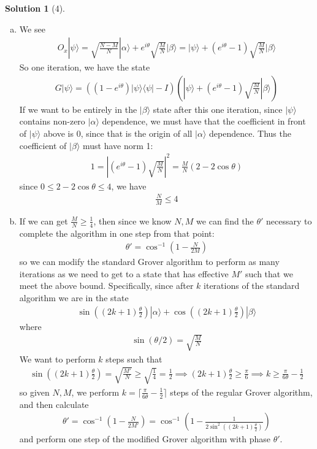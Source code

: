 \documentclass[11pt]{article}
\theoremstyle{definition}
\newtheorem*{solution}{Solution}
\newcommand{\eq}{\begin{equation}\begin{aligned}}
\newcommand{\qe}{\end{aligned}\end{equation}}
\newcommand{\bra}[1]{\langle #1|}
\newcommand{\ket}[1]{|#1\rangle}
\begin{document}
\begin{solution}[4]
  \begin{enumerate}[(a)]
    \item We see
    \eq
      O_x\ket{\psi}=\sqrt{\frac{N-M}{N}}\ket{\alpha}+e^{i\theta}\sqrt{\frac{M}{N}}\ket{\beta}=\ket{\psi}+(e^{i\theta}-1)\sqrt{\frac{M}{N}}\ket{\beta}
    \qe
    So one iteration, we have the state
    \eq
      G\ket{\psi}=((1-e^{i\theta})\ket{\psi}\bra{\psi}-I)\left(\ket{\psi}+(e^{i\theta}-1)\sqrt{\frac{M}{N}}\ket{\beta}\right)
    \qe
    If we want to be entirely in the $\ket{\beta}$ state after this one iteration, since $\ket{\psi}$ contains non-zero $\ket{\alpha}$ dependence, we must have that the coefficient in front of $\ket{\psi}$ above is 0, since that is the origin of all $\ket{\alpha}$ dependence. Thus the coefficient of $\ket{\beta}$ must have norm 1:
    \eq
      1=\left|(e^{i\theta}-1)\sqrt{\frac{M}{N}}\right|^2=\frac{M}{N}(2-2\cos\theta)
    \qe
    since $0\leq 2-2\cos\theta\leq 4$, we have
    \eq
      \boxed{\frac{N}{M}\leq 4}
    \qe
    \item If we can get $\frac{M}{N}\geq \frac{1}{4}$, then since we know $N,M$ we can find the $\theta'$ necessary to complete the algorithm in one step from that point:
    \eq
      \theta'=\cos^{-1}\left(1-\frac{N}{2M}\right)
    \qe
    so we can modify the standard Grover algorithm to perform as many iterations as we need to get to a state that has effective $M'$ such that we meet the above bound. Specifically, since after $k$ iterations of the standard algorithm we are in the state
    \eq
      \sin\left((2k+1)\frac{\theta}{2}\right)\ket{\alpha}+
      \cos\left((2k+1)\frac{\theta}{2}\right)\ket{\beta}
    \qe
    where 
    \eq
      \sin(\theta/2)=\sqrt{\frac{M}{N}}
    \qe
    We want to perform $k$ steps such that
    \eq
      \sin\left((2k+1)\frac{\theta}{2}\right)=\sqrt{\frac{M'}{N}}\geq \sqrt{\frac{1}{4}}=\frac{1}{2}\implies (2k+1)\frac{\theta}{2}\geq \frac{\pi}{6}\implies k\geq \frac{\pi}{6\theta}-\frac{1}{2}
    \qe
    so given $N,M$, we perform $k=\lceil \frac{\pi}{6\theta}-\frac{1}{2}\rceil$ steps of the regular Grover algorithm, and then calculate
    \eq
      \theta'=\cos^{-1}\left(1-\frac{N}{2M'}\right)=\cos^{-1}\left(1-\frac{1}{2\sin^2\left((2k+1)\frac{\theta}{2}\right)}\right)
    \qe
    and perform one step of the modified Grover algorithm with phase $\theta'$. 
  \end{enumerate}
\end{solution}
\end{document}
